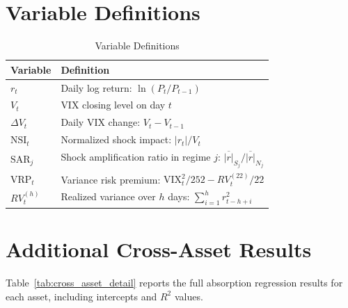 \documentclass[12pt,a4paper]{article}
\begin{document}
\newpage
\appendix
\section{Variable Definitions}
\label{app:variables}

\begin{table}[H]
\centering
\caption{Variable Definitions}
\label{tab:variables}
\begin{tabular}{lp{10cm}}
\toprule
Variable & Definition \\
\midrule
$r_t$ & Daily log return: $\ln(P_t / P_{t-1})$ \\
$V_t$ & VIX closing level on day $t$ \\
$\Delta V_t$ & Daily VIX change: $V_t - V_{t-1}$ \\
$\text{NSI}_t$ & Normalized shock impact: $|r_t| / V_t$ \\
$\text{SAR}_j$ & Shock amplification ratio in regime $j$: $\overline{|r|}_{S_j} / \overline{|r|}_{N_j}$ \\
$\text{VRP}_t$ & Variance risk premium: $\text{VIX}_t^2 / 252 - RV_t^{(22)} / 22$ \\
$RV_t^{(h)}$ & Realized variance over $h$ days: $\sum_{i=1}^{h} r_{t-h+i}^2$ \\
\bottomrule
\end{tabular}
\end{table}

\section{Additional Cross-Asset Results}
\label{app:cross_asset}

Table~\ref{tab:cross_asset_detail} reports the full absorption regression results for each asset, including intercepts and $R^2$ values.
\end{document}
